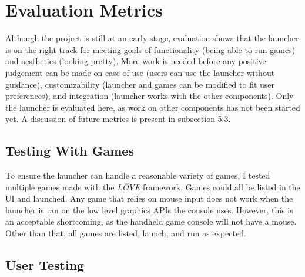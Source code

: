 \documentclass[10pt,twocolumn]{article}
\begin{document}

\section{Evaluation Metrics}

Although the project is still at an early stage, evaluation shows that the
launcher is on the right track for meeting goals of functionality
(being able to run games) and aesthetics (looking pretty). More work is needed
before any positive judgement can be made on ease of use (users can use the
launcher without guidance), customizability (launcher and games can be
modified to fit user preferences), and integration (launcher works with the
other components). Only the launcher is evaluated here, as work on other
components has not been started yet. A discussion of future metrics is present
in subsection 5.3.

\subsection{Testing With Games}

To ensure the launcher can handle a reasonable variety of games, I tested
multiple games made with the \textit{LÖVE} framework.
Games could all be listed in the UI
and launched. Any game that relies on mouse input does not work when the
launcher is ran on the low level graphics APIs the console uses. However, this
is an acceptable shortcoming, as the handheld game console will not have a
mouse. Other than that, all games are listed, launch, and run as expected.

\subsection{User Testing}
\end{document}
